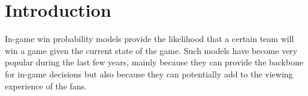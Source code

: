 \section{Introduction}
\label{sec:intro}

In-game win probability models provide the likelihood that a certain team will win a game given the current state of the game.  
Such models have become very popular during the last few years, mainly because they can provide the backbone for in-game decisions but also because they can potentially add to the viewing experience of the fans.